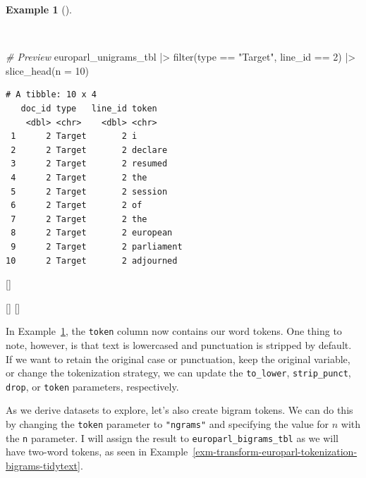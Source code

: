 \documentclass[
  letterpaper,
  krantz1]{latex/krantz-mod}
\newenvironment{Shaded}{\begin{snugshade}}{\end{snugshade}}
\newcommand{\AttributeTok}[1]{\textcolor[rgb]{0.00,0.00,0.00}{#1}}
\newcommand{\CommentTok}[1]{\textcolor[rgb]{0.00,0.00,0.00}{\textit{#1}}}
\newcommand{\DecValTok}[1]{\textcolor[rgb]{0.00,0.00,0.00}{#1}}
\newcommand{\FunctionTok}[1]{\textcolor[rgb]{0.00,0.00,0.00}{#1}}
\newcommand{\NormalTok}[1]{\textcolor[rgb]{0.00,0.00,0.00}{#1}}
\newcommand{\SpecialCharTok}[1]{\textcolor[rgb]{0.00,0.00,0.00}{#1}}
\newcommand{\StringTok}[1]{\textcolor[rgb]{0.00,0.00,0.00}{#1}}
\newcommand{\cindex}[1]{%
  \StrSubstitute{#1}{_}{\_}[\temp]%
  \index{\temp}%
}
\theoremstyle{definition}
\theoremstyle{definition}
\newtheorem{example}{Example}[chapter]
\theoremstyle{remark}
\begin{document}
\begin{example}[]\protect\hypertarget{exm-transform-europarl-tokenization-words-preview}{}\label{exm-transform-europarl-tokenization-words-preview}

~

\begin{Shaded}
\begin{Highlighting}[numbers=left,,]
\CommentTok{\# Preview}
\NormalTok{europarl\_unigrams\_tbl }\SpecialCharTok{|\textgreater{}}
  \FunctionTok{filter}\NormalTok{(type }\SpecialCharTok{==} \StringTok{"Target"}\NormalTok{, line\_id }\SpecialCharTok{==} \DecValTok{2}\NormalTok{) }\SpecialCharTok{|\textgreater{}}
  \FunctionTok{slice\_head}\NormalTok{(}\AttributeTok{n =} \DecValTok{10}\NormalTok{)}
\end{Highlighting}
\end{Shaded}

\begin{verbatim}
# A tibble: 10 x 4
   doc_id type   line_id token     
    <dbl> <chr>    <dbl> <chr>     
 1      2 Target       2 i         
 2      2 Target       2 declare   
 3      2 Target       2 resumed   
 4      2 Target       2 the       
 5      2 Target       2 session   
 6      2 Target       2 of        
 7      2 Target       2 the       
 8      2 Target       2 european  
 9      2 Target       2 parliament
10      2 Target       2 adjourned 
\end{verbatim}

\cindex{==}
\cindex{filter()}\cindex{slice_head()}

\end{example}

In Example~\ref{exm-transform-europarl-tokenization-words-preview}, the
\texttt{token} column now contains our word tokens. One thing to note,
however, is that text is lowercased and punctuation is stripped by
default. If we want to retain the original case or punctuation, keep the
original variable, or change the tokenization strategy, we can update
the \texttt{to\_lower}, \texttt{strip\_punct}, \texttt{drop}, or
\texttt{token} parameters, respectively.

As we derive datasets to explore, let's also create bigram tokens. We
can do this by changing the \texttt{token} parameter to
\texttt{"ngrams"} and specifying the value for \(n\) with the \texttt{n}
parameter. I will assign the result to \texttt{europarl\_bigrams\_tbl}
as we will have two-word tokens, as seen in
Example~\ref{exm-transform-europarl-tokenization-bigrams-tidytext}.
\end{document}
